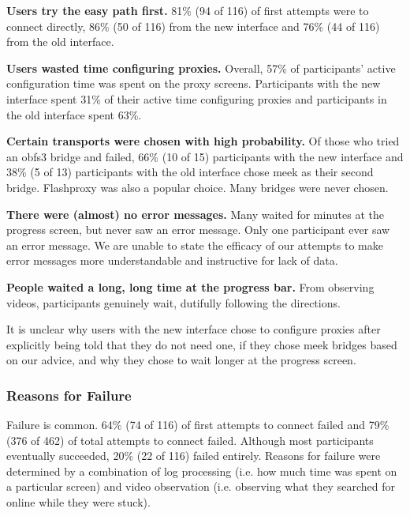 \documentclass[USenglish,oneside,twocolumn]{article}
\begin{document}
\begin{description}
\item {\bfseries Users try the easy path first.}
81\% (94 of 116) of first attempts were to connect directly, 86\% (50 of 116) from the new interface and 76\% (44 of 116) from the old interface. 

\item {\bfseries Users wasted time configuring proxies.} Overall, 57\% of participants' active configuration time was spent on the proxy screens. Participants with the new interface spent 31\% of their active time configuring proxies and participants in the old interface spent 63\%.

\item {\bfseries Certain transports were chosen with high probability.}
Of those who tried an obfs3 bridge and failed, 
66\% (10 of 15) participants with the new interface and 38\% (5 of 13) participants with the old interface chose meek as their second bridge. Flashproxy was also a popular choice. Many bridges were never chosen. 

\item {\bfseries There were (almost) no error messages.} Many waited for minutes at the progress screen, but never saw an error message. Only one participant ever saw an error message. We are unable to state the efficacy of our attempts to make error messages more understandable and instructive for lack of data.  

\item {\bfseries People waited a long, long time at the progress bar.}
From observing videos, participants genuinely wait, dutifully following the directions.   
\end{description} 

It is unclear why users with the new interface chose to configure proxies after explicitly being told that they do not need one, if they chose meek bridges based on our advice, and why they chose to wait longer at the progress screen. 

\subsubsection{Reasons for Failure} 
Failure is common. 64\% (74 of 116) of first attempts to connect failed and 79\% (376 of 462) of total attempts to connect failed. Although most participants eventually succeeded, 20\% (22 of 116) failed entirely. Reasons for failure were determined by a combination of log processing (i.e. how much time was spent on a particular screen) and video observation (i.e. observing what they searched for online while they were stuck). \\ 
\end{document}
